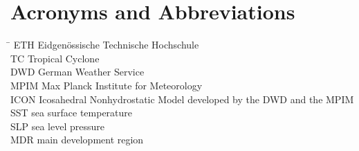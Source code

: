 \section*{Acronyms and Abbreviations}
\begin{tabbing}
 \hspace*{1.6cm}  \= \kill
 ETH \> Eidgen\"{o}ssische Technische Hochschule \\[0.5ex]
 TC \> Tropical Cyclone \\[0.5ex]
 DWD \> German Weather Service\\[0.5ex]
 MPIM \> Max Planck Institute for Meteorology\\[0.5ex]
ICON \> Icosahedral Nonhydrostatic Model developed by the DWD and the
MPIM\\[0.5ex]
SST \> sea surface temperature\\[0.5ex]
SLP \> sea level pressure\\[0.5ex]
MDR \> main development region  \\[0.5ex]
\end{tabbing}


